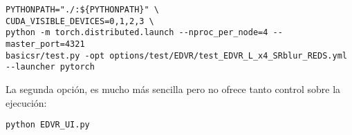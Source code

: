 \begin{verbatim}
PYTHONPATH="./:${PYTHONPATH}" \
CUDA_VISIBLE_DEVICES=0,1,2,3 \
python -m torch.distributed.launch --nproc_per_node=4 --master_port=4321 
basicsr/test.py -opt options/test/EDVR/test_EDVR_L_x4_SRblur_REDS.yml
--launcher pytorch
\end{verbatim}


La segunda opción, es mucho más sencilla pero no ofrece tanto control sobre la ejecución:

\begin{verbatim}
python EDVR_UI.py
\end{verbatim}
